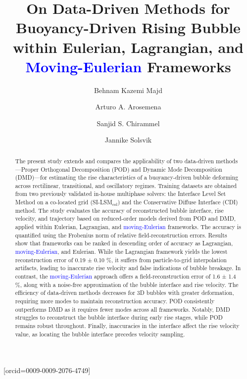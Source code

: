 \documentclass[a4paper,fleqn]{cas-sc}
\newcommand{\hl}[1]{\textcolor{blue}{#1}} %
\newcommand{\hl}[1]{#1} %
\begin{document}
	
	
	\let\WriteBookmarks\relax
	\def\floatpagepagefraction{1}
	\def\textpagefraction{.001}
	
	
	
	\title[mode=title]{On Data-Driven Methods for Buoyancy-Driven Rising Bubble within Eulerian, Lagrangian, and \hl{Moving-Eulerian} Frameworks}  
	
	
	\author[1]{Behnam Kazemi Majd}[orcid=0009-0009-2076-4749]  %
	\cormark[1]
	
	\author[1]{Arturo A. Arosemena}
	\author[1]{Sanjid S. Chirammel}
	\author[1]{Jannike Solsvik}
	

	
	
	
	\begin{abstract}
		The present study extends and compares the applicability of two data-driven methods—Proper Orthogonal Decomposition (POD) and Dynamic Mode Decomposition (DMD)—for estimating the rise characteristics of a buoyancy-driven bubble deforming across rectilinear, transitional, and oscillatory regimes. Training datasets are obtained from two previously validated in-house multiphase solvers: the  Interface Level Set Method on a co-located grid (SI-LSM$_{\text{col}}$) and the Conservative Diffuse Interface (CDI) method. The study evaluates the accuracy of reconstructed bubble interface, rise velocity, and trajectory based on reduced-order models derived from POD and DMD, applied within Eulerian, Lagrangian, and \hl{moving-Eulerian} frameworks. The accuracy is quantified using the Frobenius norm of relative field-reconstruction errors. Results show that frameworks can be ranked in descending order of accuracy as Lagrangian, \hl{moving-Eulerian}, and Eulerian. While the Lagrangian framework yields the lowest reconstruction error of 0.19 ± 0.10 \%, it suffers from particle-to-grid interpolation artifacts, leading to inaccurate rise velocity and false indications of bubble breakage. In contrast, the \hl{moving-Eulerian} approach offers a field-reconstruction error of 1.6 ± 1.4 \%, along with a noise-free approximation of the bubble interface and rise velocity. The efficiency of data-driven methods decreases for 3D bubbles with greater deformation, requiring more modes to maintain reconstruction accuracy. POD consistently outperforms DMD as it requires fewer modes across all frameworks. Notably, DMD struggles to reconstruct the bubble interface during early rise stages, while POD remains robust throughout. Finally, inaccuracies in the interface affect the rise velocity value, as locating the bubble interface precedes velocity sampling.
		
	\end{abstract}
	
\end{document}
